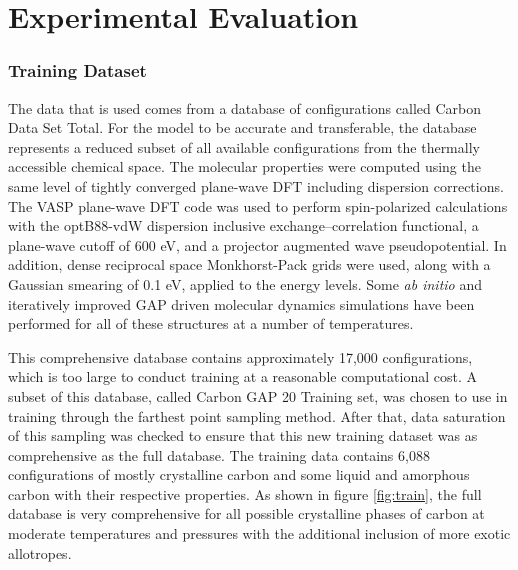 \documentclass[12pt, abstract = true]{scrartcl}
\begin{document}
\newpage

\section{Experimental Evaluation}
\subsubsection{Training Dataset}\label{Train}
The data that is used comes from a database of configurations called Carbon Data Set Total\cite{gap20}. For the model to be accurate and transferable, the database represents a reduced subset of all available configurations from the thermally accessible chemical space. The molecular properties were computed using the same level of tightly converged plane-wave DFT including dispersion corrections. The VASP plane-wave DFT code was used to perform spin-polarized calculations with the optB88-vdW dispersion inclusive exchange–correlation functional, a plane-wave cutoff of 600 eV, and a projector augmented wave pseudopotential. In addition, dense reciprocal space Monkhorst-Pack grids were used, along with a Gaussian smearing of 0.1 eV, applied to the energy levels. Some \emph{ab initio} and iteratively improved GAP driven molecular dynamics simulations have been performed for all of these structures at a number of temperatures. 

This comprehensive database contains approximately 17,000 configurations, which is too large to conduct training at a reasonable computational cost. A subset of this database, called Carbon GAP 20 Training set, was chosen to use in training through the farthest point sampling method. After that, data saturation of this sampling was checked to ensure that this new training dataset was as comprehensive as the full database. The training data contains 6,088 configurations of mostly crystalline carbon and some liquid and amorphous carbon with their respective properties. As shown in figure \ref{fig:train}, the full database is very comprehensive for all possible crystalline phases of carbon at moderate temperatures and pressures with the additional inclusion of more exotic allotropes. 
\end{document}
